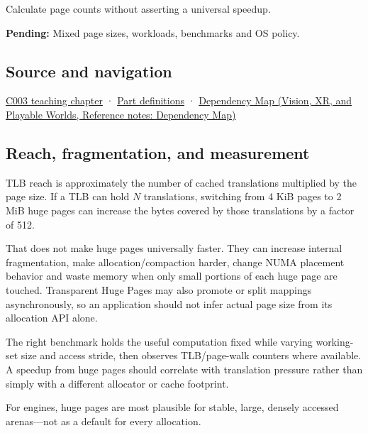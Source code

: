 Calculate page counts without asserting a universal speedup.

\textbf{Pending:} Mixed page sizes, workloads, benchmarks and OS policy.

\subsection{Source and navigation}\label{appendix-ce688d1acdab-source-and-navigation}

\hyperref[01-foundations-i-ch002-where-the-bytes-live]{C003 teaching chapter} · \hyperref[appendix-fd090d982a15-m003---parts-41-60]{Part definitions} · \href{../07-Vision-XR-and-Playable-Worlds/main.pdf\#nameddest=appendix-4ad47bdd269a}{Dependency Map (Vision, XR, and Playable Worlds, Reference notes: Dependency Map)}

\subsection{Reach, fragmentation, and measurement}\label{appendix-ce688d1acdab-reach-fragmentation-and-measurement}

TLB reach is approximately the number of cached translations multiplied by the page size. If a TLB can hold \(N\) translations, switching from 4 KiB pages to 2 MiB huge pages can increase the bytes covered by those translations by a factor of 512.

That does not make huge pages universally faster. They can increase internal fragmentation, make allocation/compaction harder, change NUMA placement behavior and waste memory when only small portions of each huge page are touched. Transparent Huge Pages may also promote or split mappings asynchronously, so an application should not infer actual page size from its allocation API alone.

The right benchmark holds the useful computation fixed while varying working-set size and access stride, then observes TLB/page-walk counters where available. A speedup from huge pages should correlate with translation pressure rather than simply with a different allocator or cache footprint.

For engines, huge pages are most plausible for stable, large, densely accessed arenas---not as a default for every allocation.
